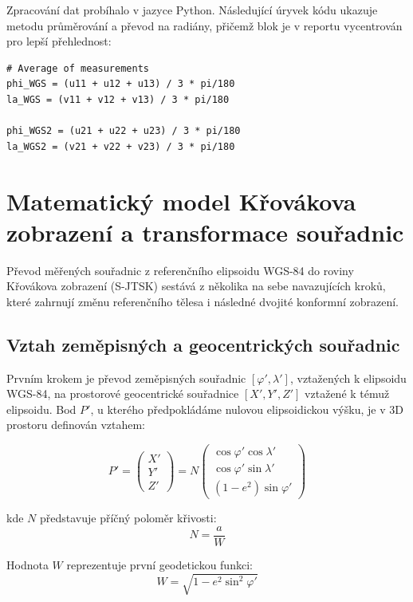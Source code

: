 \documentclass[12pt, a4paper]{article}
\begin{document}
Zpracování dat probíhalo v jazyce Python. Následující úryvek kódu ukazuje metodu průměrování a převod na radiány, přičemž blok je v reportu vycentrován pro lepší přehlednost:

\vspace{0.5cm}
\begin{center}
\begin{minipage}{0.7\textwidth}
\begin{verbatim}
# Average of measurements
phi_WGS = (u11 + u12 + u13) / 3 * pi/180
la_WGS = (v11 + v12 + v13) / 3 * pi/180

phi_WGS2 = (u21 + u22 + u23) / 3 * pi/180
la_WGS2 = (v21 + v22 + v23) / 3 * pi/180
\end{verbatim}
\end{minipage}
\end{center}


\section{Matematický model Křovákova zobrazení a transformace souřadnic}
Převod měřených souřadnic z referenčního elipsoidu WGS-84 do roviny Křovákova zobrazení (S-JTSK) sestává z několika na sebe navazujících kroků, které zahrnují změnu referenčního tělesa i následné dvojité konformní zobrazení. 

\subsection{Vztah zeměpisných a geocentrických souřadnic}
Prvním krokem je převod zeměpisných souřadnic $[\varphi', \lambda']$, vztažených k elipsoidu WGS-84, na prostorové geocentrické souřadnice $[X', Y', Z']$ vztažené k témuž elipsoidu. Bod $P'$, u kterého předpokládáme nulovou elipsoidickou výšku, je v 3D prostoru definován vztahem:

$$P' = \begin{pmatrix} X' \\ Y' \\ Z' \end{pmatrix} = N \begin{pmatrix} \cos \varphi' \cos \lambda' \\ \cos \varphi' \sin \lambda' \\ (1 - e^2) \sin \varphi' \end{pmatrix}$$

kde $N$ představuje příčný poloměr křivosti:
$$N = \frac{a}{W}$$

Hodnota $W$ reprezentuje první geodetickou funkci:
$$W = \sqrt{1 - e^2 \sin^2 \varphi'}$$
\end{document}
